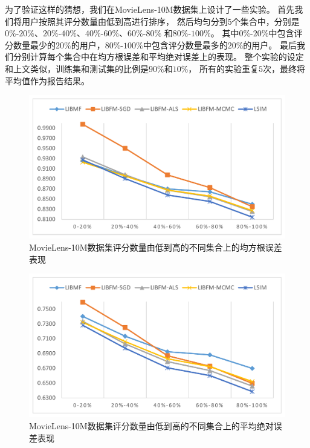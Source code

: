 为了验证这样的猜想，我们在MovieLens-10M数据集上设计了一些实验。
首先我们将用户按照其评分数量由低到高进行排序，
然后均匀分到$5$个集合中，分别是$0\%$-$20\%$、$20\%$-$40\%$、$40\%$-$60\%$、$60\%$-$80\%$
和$80\%$-$100\%$。
其中$0\%$-$20\%$中包含评分数量最少的$20\%$的用户，$80\%$-$100\%$中包含评分数量最多的$20\%$的用户。
最后我们分别计算每个集合中在均方根误差和平均绝对误差上的表现。
整个实验的设定和上文类似，训练集和测试集的比例是$90\%$和$10\%$，
所有的实验重复$5$次，最终将平均值作为报告结果。

\begin{figure}[htbp]
    \centering
    \includegraphics[scale=0.36]{images/rank_rmse.pdf}
    \caption{MovieLens-10M数据集评分数量由低到高的不同集合上的均方根误差表现}
    \label{fig:rank_rsme}
\end{figure}

\begin{figure}[htbp]
    \centering
    \includegraphics[scale=0.36]{images/rank_mae.pdf}
    \caption{MovieLens-10M数据集评分数量由低到高的不同集合上的平均绝对误差表现}
    \label{fig:rank_mae}
\end{figure}

